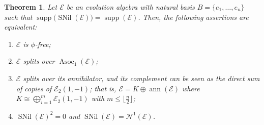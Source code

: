 \documentclass[12pt,reqno]{amsart}
\newtheorem{theorem}{Theorem}[section]
\theoremstyle{definition}
\theoremstyle{remark}
\DeclareMathOperator{\ann}{ann}
\DeclareMathOperator{\supp}{supp}
\DeclareMathOperator{\asoc}{Asoc}
\DeclareMathOperator{\snil}{SNil}
\numberwithin{equation}{section}
\begin{document}
\begin{theorem}\label{th:equiv_frat}
Let $\mathcal{E}$ be an evolution algebra with natural basis $B=\{e_1,\dots,e_n\}$ such that $\supp\big(\snil(\mathcal{E})\big)=\supp(\mathcal{E})$. Then, the following assertions are equivalent:
\begin{enumerate}[\rm (i)]
\item $\mathcal{E}$ is $\phi$-free;
\item $\mathcal{E}$ splits over $\asoc_1(\mathcal{E})$;
\item $\mathcal{E}$ splits over its annihilator, and its complement can be seen as the direct sum of copies of $\mathcal{E}_2(1,-1)$; that is, $\mathcal{E}=K\oplus\ann(\mathcal{E})$ where $K\cong\bigoplus_{i=1}^m\mathcal{E}_2(1,-1)$ with $m\leq\lfloor\frac{n}{2}\rfloor$;
\item $\snil(\mathcal{E})^2=0$ and $\snil(\mathcal{E})=\mathcal{N}^1(\mathcal{E})$.
\end{enumerate}
\end{theorem}
\end{document}
